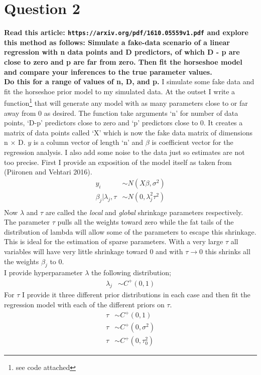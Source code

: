 \documentclass{article}
\begin{document}
\section{Question 2}
\textbf{Read this article: \texttt{https://arxiv.org/pdf/1610.05559v1.pdf} and explore this method as follows: Simulate a fake-data scenario of a linear regression with n data points and D predictors, of which D - p are close to zero and p are far from zero. Then fit the horseshoe model and compare your inferences to the true parameter values.\\
Do this for a range of values of n, D, and p.}
\newpage
I simulate some fake data and fit the horseshoe prior model to my simulated data. At the outset I write a function\footnote{see code attached} that will generate any model with as many parameters close to or far away from 0 as desired. The function take arguments `n' for number of data points, `D-p' predictors close to zero and `p' predictors close to 0. It creates a matrix of data points called `X' which is now the fake data matrix of dimensions n $\times$ D. $y$ is a column vector of length `n' and $\beta$ is coefficient vector for the regression analysis. I also add some noise to the data just so estimates are not too precise.
First I provide an exposition of the model itself as taken from (Piironen and Vehtari 2016).
\begin{align}
\displaystyle
y_i & \sim N(X\beta,  \sigma^2) \\
\beta_j|\lambda_j , \tau & \sim N(0, \lambda_j^2\tau^2) \\
\end{align}
Now $\lambda$ and $\tau$ are called the \textit{local} and \textit{global} shrinkage parameters respectively. The parameter $\tau$ pulls all the weights toward zero while the fat tails of the distribution of lambda will allow some of the parameters to escape this shrinkage. This is ideal for the estimation of sparse parameters. With a very large $\tau$ all variables will have very little shrinkage toward 0 and with $\tau \rightarrow 0$ this shrinks all the weights $\beta_j$ to 0.\\
I provide hyperparameter $\lambda$ the following distribution;
\begin{align}
\lambda_j & \sim C^{+}(0, 1) 
\end{align}
For $\tau$ I provide it three different prior distributions in each case and then fit the regression model with each of the different priors on $\tau$.
\begin{align}
\tau & \sim C^{+}(0, 1)\\
\tau & \sim C^{+}(0, \sigma^2)\\
\tau & \sim C^{+}(0, \tau_0^2)
\end{align}
\end{document}
